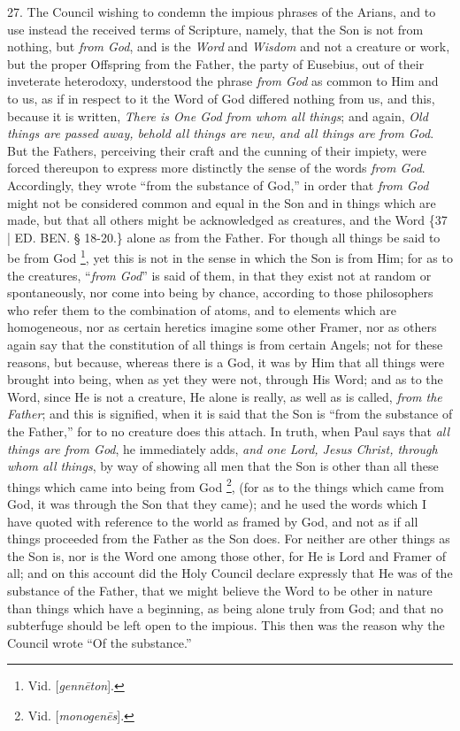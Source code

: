 27. The Council wishing to
condemn the impious phrases of the Arians, and to use instead the
received terms of Scripture, namely, that the Son is not from nothing,
but \emph{from God}, and is the \emph{Word} and \emph{Wisdom} and not
a creature or work, but the proper Offspring from the Father, the
party of Eusebius, out of their inveterate heterodoxy, understood the
phrase \emph{from God} as common to Him and to us, as if in respect to
it the Word of God differed nothing from us, and this, because it is
written, \emph{There is One God from whom all things}; and again, \emph{Old
things are passed away, behold all things are new, and all things are
from God}. But the Fathers, perceiving their craft and the cunning
of their impiety, were forced thereupon to express more distinctly the
sense of the words \emph{from God}. Accordingly, they wrote ``from the
substance of God,'' in order that \emph{from God} might not be
considered common and equal in the Son and in things which are made,
but that all others might be acknowledged as creatures, and the Word
\{37 | ED. BEN.
§ 18-20.\} alone as from the Father. For though all things be said to
be from God \footnote{Vid. [\emph{genn\={e}ton}].}, yet this
is not in the sense in which the Son is from Him; for as to the
creatures, ``\emph{from God}'' is said of them, in that they exist not
at random or spontaneously, nor come into being by chance, according
to those philosophers who refer them to the combination of atoms, and
to elements which are homogeneous, nor as certain heretics imagine
some other Framer, nor as others again say that the constitution of
all things is from certain Angels; not for these reasons, but because,
whereas there is a God, it was by Him that all things were brought
into being, when as yet they were not, through His Word; and as to the
Word, since He is not a creature, He alone is really, as well as is
called, \emph{from the Father}; and this is signified, when it is said
that the Son is ``from the substance of the Father,'' for to no creature
does this attach. In truth, when Paul says that \emph{all things are from
God}, he immediately adds, \emph{and one Lord, Jesus Christ, through
whom all things}, by way of showing all men that the Son is other
than all these things which came into being from God \footnote{Vid. [\emph{monogen\={e}s}].}, (for as to the things which came from God, it was through the
Son that they came); and he used the words which I have quoted with
reference to the world as framed by God, and not as if all things
proceeded from the Father as the Son does. For neither are other
things as the Son is, nor is the Word one among those other, for He is
Lord and Framer of all; and on this account did the Holy Council
declare expressly that He was of the substance of the Father, that we
might believe the Word to be other in nature than things which have a
beginning, as being alone truly from God; and that no subterfuge
should be left open to the impious. This then was the reason why the
Council wrote ``Of the substance.''

